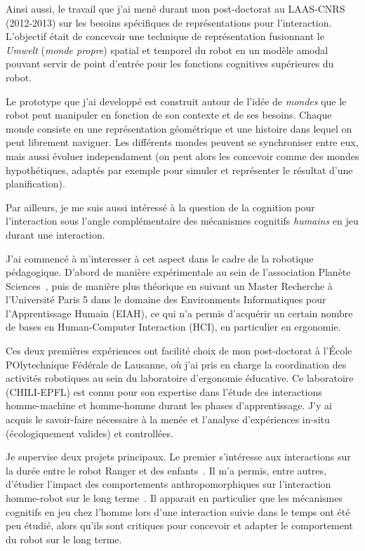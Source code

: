 \documentclass[a4paper]{article}
\begin{document}
Ainsi aussi, le travail que j'ai mené durant mon post-doctorat au LAAS-CNRS
(2012-2013) sur les besoins spécifiques de représentations pour l'interaction.
L'objectif était de concevoir une technique de représentation fusionnant le
\emph{Umwelt} (\emph{monde propre}) spatial et temporel du robot en un modèle
amodal pouvant servir de point d'entrée pour les fonctions cognitives
supérieures du robot.

Le prototype que j'ai developpé est construit autour de l'idée de \emph{mondes}
que le robot peut manipuler en fonction de son contexte et de ses besoins.
Chaque monde consiste en une représentation géométrique et une histoire dans
lequel on peut librement naviguer. Les différents mondes peuvent se synchroniser
entre eux, mais aussi évoluer independament (on peut alors les concevoir comme
des mondes hypothétiques, adaptés par exemple pour simuler et représenter le
résultat d'une planification).

Par ailleurs, je me suis aussi intéressé à la question de la cognition pour
l'interaction sous l'angle complémentaire des mécanismes cognitifs
\emph{humains} en jeu durant une interaction.

J'ai commencé à m'interesser à cet aspect dans le cadre de la robotique
pédagogique. D'abord de manière expérimentale au sein de l'association Planète
Sciences~\cite{stinckwich2007squeakbot}, puis de manière plus théorique en
suivant un Master Recherche à l'Université Paris 5 dans le domaine des
Environments Informatiques pour l'Apprentissage Humain (EIAH), ce qui n'a permis
d'acquérir un certain nombre de bases en Human-Computer Interaction (HCI), en
particulier en ergonomie.

Ces deux premières expériences ont facilité choix de mon post-doctorat à l'École
POlytechnique Fédérale de Lausanne, où j'ai pris en charge la coordination des
activités robotiques au sein du laboratoire d'ergonomie éducative. Ce
laboratoire (CHILI-EPFL) est connu pour son expertise dans l'étude des
interactions homme-machine et homme-homme durant les phases d'apprentissage. J'y
ai acquis le savoir-faire nécessaire à la menée et l'analyse d'expériences
in-situ (écologiquement valides) et controllées.

Je supervise deux projets principaux. Le premier s'intéresse aux interactions
sur la durée entre le robot Ranger et des enfants~\cite{fink2014which}. Il m'a
permis, entre autres, d'étudier l'impact des comportements anthropomorphiques
sur l'interaction homme-robot sur le long terme~\cite{lemaignan2014dynamics}. Il
apparait en particulier que les mécanismes cognitifs en jeu chez l'homme lors
d'une interaction suivie dans le temps ont été peu étudié, alors qu'ils sont
critiques pour concevoir et adapter le comportement du robot sur le long terme.
\end{document}
